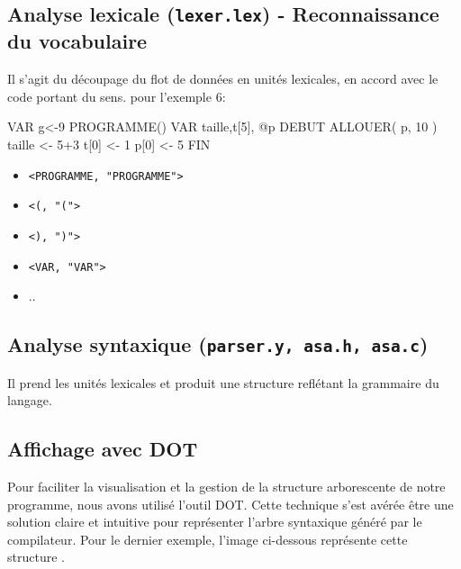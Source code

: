 \documentclass[a4paper,10pt]{article}
\begin{document}
\subsection*{Analyse lexicale (\texttt{lexer.lex}) - Reconnaissance du vocabulaire}
Il s'agit du découpage du flot de données en unités lexicales, en accord avec le code portant du sens. pour l'exemple 6:

\begin{algo}
VAR g<-9
PROGRAMME()
VAR taille,t[5], @p
DEBUT
    ALLOUER( p, 10 )
    taille <- 5+3
    t[0] <- 1
    p[0] <- 5
FIN
\end{algo}





\begin{itemize}
 \item \texttt{<PROGRAMME, "PROGRAMME">}
 \item \texttt{<(, "(">}
 \item \texttt{<), ")"> }
 \item \texttt{<VAR, "VAR">}

 \item ..
\end{itemize}

\subsection*{Analyse syntaxique (\texttt{parser.y, asa.h, asa.c})}
Il prend les unités lexicales et produit une structure reflétant la grammaire du langage.

\subsection*{Affichage avec DOT}
Pour faciliter la visualisation et la gestion de la structure arborescente de notre programme, nous avons utilisé l'outil DOT. Cette technique s'est avérée être une solution claire et intuitive pour représenter l'arbre syntaxique généré par le compilateur. Pour le dernier exemple, l'image ci-dessous représente cette structure .
\end{document}
